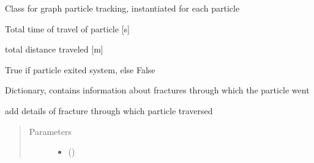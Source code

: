 \documentclass[letterpaper,10pt,english]{sphinxmanual}
\begin{document}
\begin{fulllineitems}
\label{\detokenize{pydfnworks:pydfnworks.dfnGraph.graph_transport.Particle}}
Class for graph particle tracking, instantiated for each particle


\begin{fulllineitems}
Total time of travel of particle {[}s{]}

\end{fulllineitems}



\begin{fulllineitems}
total distance traveled {[}m{]}

\end{fulllineitems}



\begin{fulllineitems}
True if particle exited system, else False

\end{fulllineitems}



\begin{fulllineitems}
Dictionary, contains information about fractures through which the particle went

\end{fulllineitems}


\begin{fulllineitems}
\label{\detokenize{pydfnworks:pydfnworks.dfnGraph.graph_transport.Particle.add_frac_data}}
add details of fracture through which particle traversed
\begin{quote}\begin{description}
\item[{Parameters}] \leavevmode\begin{itemize}
\item {} 
 () \textendash{} 


\end{itemize}
\end{description}
\end{quote}
\end{fulllineitems}
\end{fulllineitems}
\end{document}
